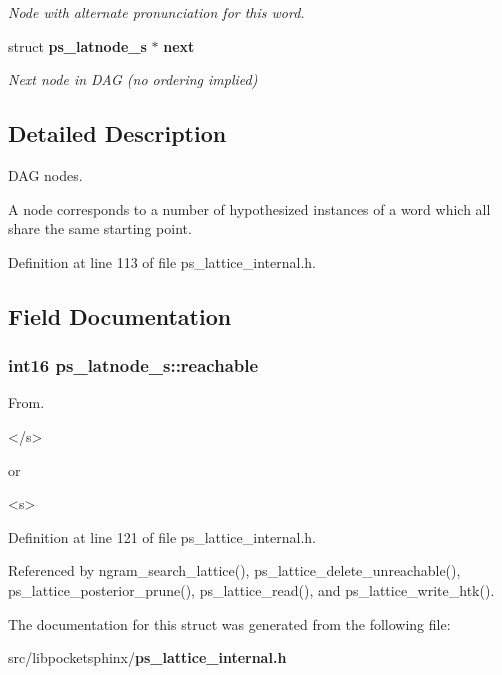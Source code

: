 \begin{DoxyCompactItemize}
\begin{DoxyCompactList}\small\item\em Node with alternate pronunciation for this word. \end{DoxyCompactList}\item 
struct {\bf ps\-\_\-latnode\-\_\-s} $\ast$ {\bf next}\label{structps__latnode__s_aca6f3d543a1712a1ca3bb8ec60f71c84}

\begin{DoxyCompactList}\small\item\em Next node in D\-A\-G (no ordering implied) \end{DoxyCompactList}\end{DoxyCompactItemize}


\subsection{Detailed Description}
D\-A\-G nodes. 

A node corresponds to a number of hypothesized instances of a word which all share the same starting point. 

Definition at line 113 of file ps\-\_\-lattice\-\_\-internal.\-h.



\subsection{Field Documentation}
\subsubsection[{reachable}]{\setlength{\rightskip}{0pt plus 5cm}int16 ps\-\_\-latnode\-\_\-s\-::reachable}\label{structps__latnode__s_af9c4c69f5f85bbc36818357a52432565}


From. 

\begin{DoxyVerb}</s> \end{DoxyVerb}
 or\begin{DoxyVerb}<s> \end{DoxyVerb}
 

Definition at line 121 of file ps\-\_\-lattice\-\_\-internal.\-h.



Referenced by ngram\-\_\-search\-\_\-lattice(), ps\-\_\-lattice\-\_\-delete\-\_\-unreachable(), ps\-\_\-lattice\-\_\-posterior\-\_\-prune(), ps\-\_\-lattice\-\_\-read(), and ps\-\_\-lattice\-\_\-write\-\_\-htk().



The documentation for this struct was generated from the following file\-:\begin{DoxyCompactItemize}
\item 
src/libpocketsphinx/{\bf ps\-\_\-lattice\-\_\-internal.\-h}\end{DoxyCompactItemize}
